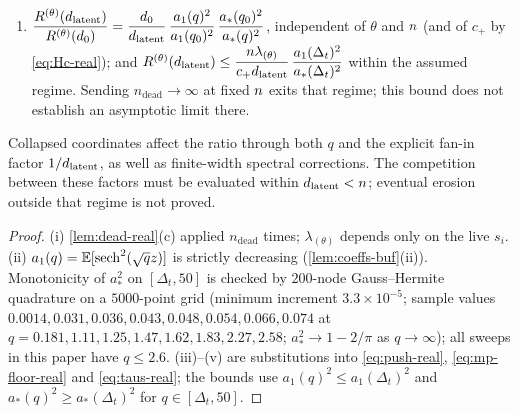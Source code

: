 \begin{proposition}
\begin{enumerate}
\item[(v)] $\dfrac{R^{(\theta)}(d_{\mathrm{latent}})}{R^{(\theta)}(d_0)}=\dfrac{d_0}{d_{\mathrm{latent}}}\,\dfrac{a_1(q)^2}{a_1(q_0)^2}\,\dfrac{a_\ast(q_0)^2}{a_\ast(q)^2}$, independent of $\theta$ and $n$ (and of $c_+$ by \eqref{eq:Hc-real}); and $R^{(\theta)}(d_{\mathrm{latent}})\le\dfrac{n\lambda_{(\theta)}}{c_+d_{\mathrm{latent}}}\,\dfrac{a_1(\Delta_t)^2}{a_\ast(\Delta_t)^2}$ within the assumed regime. Sending $n_{\mathrm{dead}}\to\infty$ at fixed $n$ exits that regime; this bound does not establish an asymptotic limit there.
\end{enumerate}
Collapsed coordinates affect the ratio through both $q$ and the explicit fan-in factor $1/d_{\mathrm{latent}}$, as well as finite-width spectral corrections. The competition between these factors must be evaluated within $d_{\mathrm{latent}}<n$; eventual erosion outside that regime is not proved.
\end{proposition}
\begin{proof}
(i) \cref{lem:dead-real}(c) applied $n_{\mathrm{dead}}$ times; $\lambda_{(\theta)}$ depends only on the live $s_i$. (ii) $a_1(q)=\mathbb{E}[\operatorname{sech}^2(\sqrt qz)]$ is strictly decreasing (\cref{lem:coeffs-buf}(ii)). Monotonicity of $a_\ast^2$ on $[\Delta_t,50]$ is checked by $200$-node Gauss--Hermite quadrature on a $5000$-point grid (minimum increment $3.3\times10^{-5}$; sample values $0.0014,0.031,0.036,0.043,0.048,0.054,0.066,0.074$ at $q=0.181,1.11,1.25,1.47,1.62,1.83,2.27,2.58$; $a_\ast^2\to1-2/\pi$ as $q\to\infty$); all sweeps in this paper have $q\le2.6$. (iii)--(v) are substitutions into \eqref{eq:push-real}, \eqref{eq:mp-floor-real} and \eqref{eq:taus-real}; the bounds use $a_1(q)^2\le a_1(\Delta_t)^2$ and $a_\ast(q)^2\ge a_\ast(\Delta_t)^2$ for $q\in[\Delta_t,50]$.
\end{proof}

